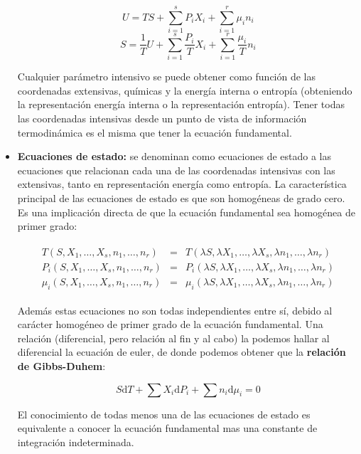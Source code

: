 \documentclass[12pt,a4paper]{article}
\newcommand{\D}{\mathrm{d}}
\begin{document}
\begin{itemize}
\begin{equation}
U = TS + \sum_{i=1}^s P_i X_i + \sum_{i=1}^r \mu_i n_i 
\end{equation}
\begin{equation}
S = \frac{1}{T} U  +  \sum_{i=1}^s \frac{P_i}{T} X_i  + \sum_{i=1}^r \frac{\mu_i}{T} n_i 
\end{equation}

Cualquier parámetro intensivo se puede obtener como función de las coordenadas extensivas,  químicas y la energía interna o entropía (obteniendo la representación energía interna o la representación entropía). Tener todas las coordenadas intensivas desde un punto de vista de información termodinámica es el misma que tener la ecuación fundamental.

\item \textbf{Ecuaciones de estado:} se denominan como ecuaciones de estado a las ecuaciones que relacionan cada una de las coordenadas intensivas con las extensivas, tanto en representación energía como entropía. La característica principal de las ecuaciones de estado es que son homogéneas de grado cero. Es una implicación directa de que la ecuación fundamental sea homogénea de primer grado:

\begin{gather}
\begin{array}{lll}
T(S, X_1, \ldots, X_s, n_1, \ldots, n_r) & = & T(\lambda S, \lambda X_1, \ldots, \lambda X_s,\lambda n_1, \ldots, \lambda n_r)  \\
P_i(S, X_1, \ldots, X_s, n_1, \ldots, n_r) & = & P_i(\lambda S, \lambda X_1, \ldots, \lambda X_s,\lambda n_1, \ldots, \lambda n_r) \\
\mu_i (S, X_1, \ldots, X_s, n_1, \ldots, n_r) & = & \mu_i (\lambda S, \lambda X_1, \ldots, \lambda X_s,\lambda n_1, \ldots, \lambda n_r)
\end{array}
\end{gather}


Además estas ecuaciones no son todas independientes entre sí, debido al carácter homogéneo de primer grado de la ecuación fundamental. Una relación (diferencial, pero relación al fin y al cabo) la podemos hallar al diferencial la ecuación de euler, de donde podemos obtener que la \textbf{relación de Gibbs-Duhem}:

\begin{equation}
S \D T + \sum X_i \D P_i + \sum n_i \D \mu_i = 0
\end{equation}

El conocimiento de todas menos una de las ecuaciones de estado es equivalente a conocer la ecuación fundamental mas una constante de integración indeterminada.


\end{itemize}
\end{document}
